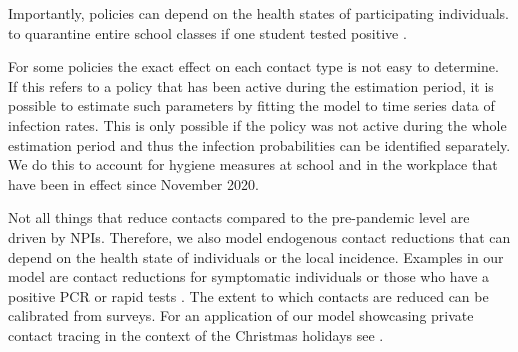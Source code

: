 Importantly, policies can depend on the health states of participating individuals.
 to quarantine entire school
classes if one student tested positive .

For some policies the exact effect on each contact type is not easy to determine. If this
refers to a policy that has been active during the estimation period, it is possible to
estimate such parameters by fitting the model to time series data of infection rates.
This is only possible if the policy was not active during the whole estimation period and
thus the infection probabilities can be identified separately. We do this to account for
hygiene measures at school and in the workplace that have been in effect since November
2020.

Not all things that reduce contacts compared to the pre-pandemic level are driven by
NPIs. Therefore, we also model endogenous contact reductions that can depend on the
health state of individuals  or the local
incidence. Examples in our model are contact reductions for symptomatic individuals or
those who have a positive PCR or rapid tests . The extent to which contacts are reduced can be
calibrated from surveys. For an application of our model showcasing private contact
tracing in the context of the Christmas holidays see \cite{Gabler2020}.





